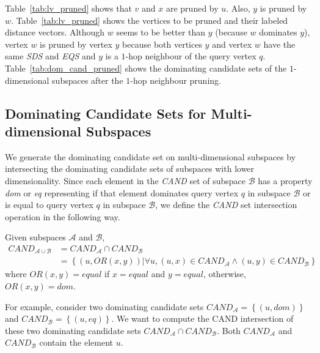 Table~\ref{tab:lv_pruned} shows that $v$ and $x$ are pruned by $u$. Also, $y$ is pruned by $w$. Table~\ref{tab:lv_pruned} shows the vertices to be pruned and their labeled distance vectors. Although $w$ seems to be better than $y$ (because $w$ dominates $y$), vertex $w$ is pruned by vertex $y$ because both vertices $y$ and vertex $w$ have the same \emph{SDS} and \emph{EQS} and $y$ is a $1$-hop neighbour of the query vertex $q$. Table~\ref{tab:dom_cand_pruned} shows the dominating candidate sets of the $1$-dimensional subspaces after the $1$-hop neighbour pruning.

\subsection{Dominating Candidate Sets for Multi-dimensional Subspaces}

We generate the dominating candidate set on multi-dimensional subspaces by intersecting the dominating candidate sets of subspaces with lower dimensionality. Since each element in the \emph{CAND} set of subspace $\mathcal{B}$ has a property \emph{dom} or \emph{eq} representing if that element dominates query vertex $q$ in subspace $\mathcal{B}$ or is equal to query vertex $q$ in subspace $\mathcal{B}$, we define the \emph{CAND} set intersection operation in the following way.

\begin{definition}
\label{def:cand_intersect}
Given subspaces $\mathcal{A}$ and $\mathcal{B}$,
\begin{equation}
\begin{split}
\mathit{CAND}_{\mathcal{A} \cup \mathcal{B}} &= \mathit{CAND}_\mathcal{A} \cap \mathit{CAND}_\mathcal{B}\\
           &= \left\{(u, OR(x, y)) |\forall u, (u, x)\in \mathit{CAND}_\mathcal{A} \wedge (u, y)\in \mathit{CAND}_\mathcal{B} \right\}
\end{split}
\end{equation}
where $OR(x, y) = equal$ if $x = equal$ and $y = equal$, otherwise, $OR(x, y) = dom$.
\end{definition}

For example, consider two dominating candidate sets $\mathit{CAND}_\mathcal{A} = \left\{(u, dom)\right\}$ and $\mathit{CAND}_\mathcal{B} = \left\{(u, eq)\right\}$. We want to compute the CAND intersection of these two dominating candidate sets $\mathit{CAND}_\mathcal{A} \cap \mathit{CAND}_\mathcal{B}$. 
Both $\mathit{CAND}_\mathcal{A}$ and $\mathit{CAND}_\mathcal{B}$ contain the element $u$. 

